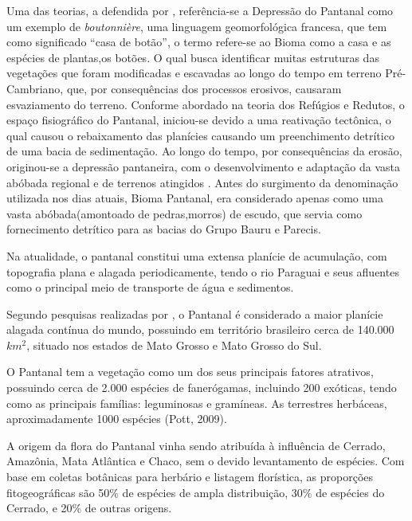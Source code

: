 Uma das teorias, a defendida por , referência-se a Depressão  do Pantanal como um exemplo de \textit{boutonnière}, uma linguagem geomorfológica francesa, que tem como significado “casa de botão”, o termo refere-se ao Bioma como a casa e as espécies de plantas,os botões. O qual busca identificar muitas estruturas das vegetações que foram modificadas e escavadas ao longo do tempo em terreno Pré-Cambriano, que, por consequências dos processos erosivos, causaram esvaziamento do terreno. Conforme abordado na teoria dos Refúgios e Redutos, o espaço fisiográfico do Pantanal, iniciou-se devido a uma reativação tectônica, o qual causou o rebaixamento das planícies causando um preenchimento detrítico de uma bacia de sedimentação. Ao longo do tempo, por consequências da erosão, originou-se a depressão pantaneira, com o desenvolvimento e adaptação da vasta abóbada regional e de terrenos atingidos \cite{ab2006brasil}. Antes do surgimento da denominação utilizada nos dias atuais, Bioma Pantanal, era considerado apenas como uma vasta abóbada(amontoado de pedras,morros) de escudo, que servia como fornecimento detrítico para as bacias do Grupo Bauru e Parecis.

Na atualidade, o pantanal constitui uma extensa planície de acumulação, com topografia plana e alagada periodicamente, tendo o rio Paraguai e seus afluentes como o principal meio de transporte de água e sedimentos. \cite{souza2006origem}

Segundo pesquisas realizadas por , o Pantanal é considerado a maior planície alagada contínua do mundo, possuindo em território brasileiro cerca de 140.000 $km^{2}$,  situado nos estados de Mato Grosso e Mato Grosso do Sul.

O Pantanal tem a vegetação como um dos seus principais fatores atrativos, possuindo cerca de 2.000 espécies de fanerógamas, incluindo 200 exóticas, tendo como as principais famílias: leguminosas e gramíneas. As terrestres herbáceas, aproximadamente 1000 espécies (Pott, 2009).

\begin{citacao}
	A origem da flora do Pantanal vinha sendo atribuída à influência de Cerrado, Amazônia, Mata Atlântica e Chaco, sem o devido levantamento de espécies. Com base em coletas botânicas para herbário e listagem florística, as proporções fitogeográficas são 50\% de espécies de ampla distribuição, 30\% de espécies do Cerrado, e 20\% de outras origens. \cite{pott2009vegetaccao}
\end{citacao}

